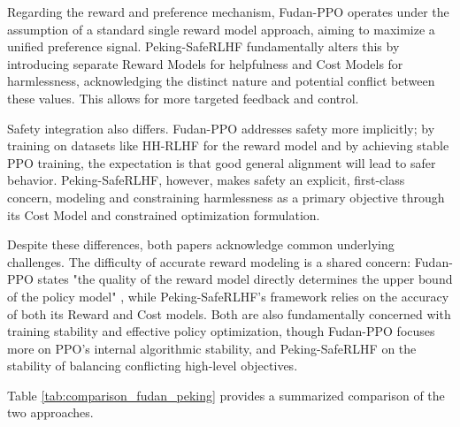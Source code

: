 \documentclass{article}
\begin{document}
Regarding the reward and preference mechanism, Fudan-PPO operates under the assumption of a standard single reward model approach, aiming to maximize a unified preference signal. Peking-SafeRLHF fundamentally alters this by introducing separate Reward Models for helpfulness and Cost Models for harmlessness, acknowledging the distinct nature and potential conflict between these values. This allows for more targeted feedback and control.

Safety integration also differs. Fudan-PPO addresses safety more implicitly; by training on datasets like HH-RLHF for the reward model \cite{Zheng2023PPO} and by achieving stable PPO training, the expectation is that good general alignment will lead to safer behavior. Peking-SafeRLHF, however, makes safety an explicit, first-class concern, modeling and constraining harmlessness as a primary objective through its Cost Model and constrained optimization formulation.

Despite these differences, both papers acknowledge common underlying challenges. The difficulty of accurate reward modeling is a shared concern: Fudan-PPO states "the quality of the reward model directly determines the upper bound of the policy model" \cite{Zheng2023PPO}, while Peking-SafeRLHF's framework relies on the accuracy of both its Reward and Cost models. Both are also fundamentally concerned with training stability and effective policy optimization, though Fudan-PPO focuses more on PPO's internal algorithmic stability, and Peking-SafeRLHF on the stability of balancing conflicting high-level objectives.

Table \ref{tab:comparison_fudan_peking} provides a summarized comparison of the two approaches.
\end{document}
